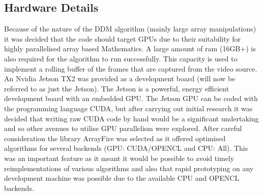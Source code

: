 \documentclass[10pt]{article}
\begin{document}
\subsection{Hardware Details}
Because of the nature of the DDM algorithm (mainly large array manipulations) it was decided that the code should target GPUs due to their suitability for highly parallelised array based Mathematics. A large amount of ram (16GB+) is also required for the algorithm to run successfully. This capacity is used to implement a rolling buffer of the frames that are captured from the video source. An Nvidia Jetson TX2 was provided as a development board (will now be referred to as just the Jetson). The Jetson is a powerful, energy efficient development board with an embedded GPU\cite{jetson}. The Jetson GPU can be coded with the programming language CUDA, but after carrying out initial research \cite{cuda_book} it was decided that writing raw CUDA code by hand would be a significant undertaking and so other avenues to utilise GPU parallelism were explored. After careful consideration the library ArrayFire was selected as it offered optimised algorithms for several backends (GPU: CUDA/OPENCL and CPU: All)\cite{arrayfire}. This was an important feature as it meant it would be possible to avoid timely reimplementations of various algorithms and also that rapid prototyping on any development machine was possible due to the available CPU and OPENCL backends.
\end{document}
